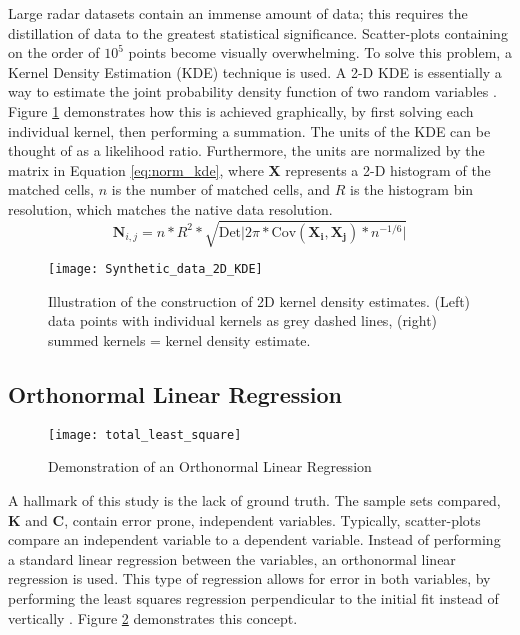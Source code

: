 Large radar datasets contain an immense amount of data; this requires the distillation of data to the greatest statistical significance. Scatter-plots containing on the order of $10^5$ points become visually overwhelming. To solve this problem, a Kernel Density Estimation (KDE) technique is used. A 2-D KDE is essentially a way to estimate the joint probability density function of two random variables \citep{Silverman1986}. Figure \ref{fig:synthetic_KDE} demonstrates how this is achieved graphically, by first solving each individual kernel, then performing a summation. The units of the KDE can be thought of as a likelihood ratio. Furthermore, the units are normalized by the matrix in Equation \ref{eq:norm_kde}, where \textbf{X} represents a 2-D histogram of the matched cells, $n$ is the number of matched cells, and $R$ is the histogram bin resolution, which matches the native data resolution.
\begin{equation}\label{eq:norm_kde}
\mathbf{N}_{i,j} = n * R^{2} * \sqrt{\mathrm{Det} \vert 2\pi * \mathrm{Cov}(\mathbf{X_{i}},\mathbf{X_{j}}) * n^{-1/6} \vert}
\end{equation}
\begin{figure}
\texttt{[image: Synthetic\_data\_2D\_KDE]}\centering
\caption{Illustration of the construction of 2D kernel density estimates. (Left) data points with individual kernels as grey dashed lines, (right) summed kernels = kernel density estimate.} 
\label{fig:synthetic_KDE}
\end{figure}

\subsection{Orthonormal Linear Regression}
\begin{figure}
\texttt{[image: total\_least\_square]}\centering
\caption{Demonstration of an Orthonormal Linear Regression} 
\label{fig:total_least_squares}
\end{figure}
A hallmark of this study is the lack of ground truth. The sample sets compared, \textbf{K} and \textbf{C}, contain error prone, independent variables. Typically, scatter-plots compare an independent variable to a dependent variable. Instead of performing a standard linear regression between the variables, an orthonormal linear regression is used. This type of regression allows for error in both variables, by performing the least squares regression perpendicular to the initial fit instead of vertically \citep{Markovsky2007}. Figure \ref{fig:total_least_squares} demonstrates this concept.

